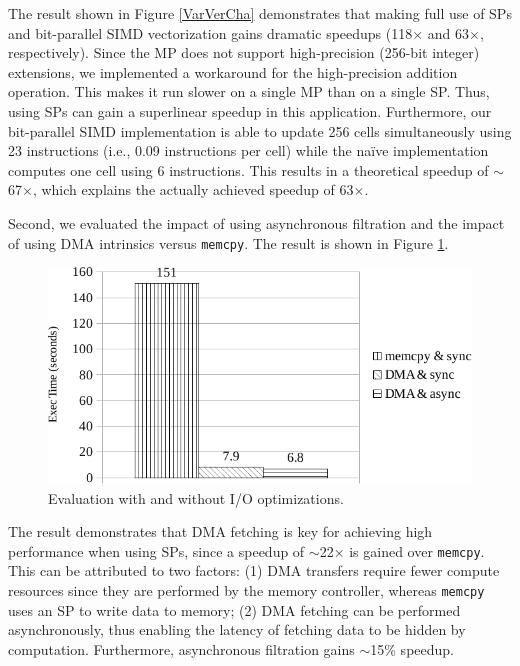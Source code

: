 \documentclass[conference]{IEEEtran}
\begin{document}
The result shown in Figure \ref{VarVerCha} demonstrates that making
full use of SPs and bit-parallel SIMD vectorization gains dramatic
speedups (118$\times$ and 63$\times$, respectively). Since the MP does
not support high-precision (256-bit integer) extensions, we
implemented a workaround for the high-precision addition
operation. This makes it run slower on a single MP than on a single
SP. Thus, using SPs can gain a superlinear speedup in this
application. Furthermore, our bit-parallel SIMD implementation is able
to update 256 cells simultaneously using 23 instructions (i.e., 0.09
instructions per cell) while the na\"ive implementation computes one
cell using 6 instructions. This results in a theoretical speedup of
$\sim$67$\times$, which explains the actually achieved speedup of
63$\times$.

Second, we evaluated the impact of using asynchronous filtration and
the impact of using DMA intrinsics versus \texttt{memcpy}. The result
is shown in Figure \ref{VarOptCha}.

\begin{figure}[!htb]
  \begin{center}
    \includegraphics[width=1\linewidth]{figures/VarOptCha}
    \caption{Evaluation with and without I/O optimizations.}
    \label{VarOptCha}
  \end{center}
\end{figure}

The result demonstrates that DMA fetching is key for achieving high
performance when using SPs, since a speedup of $\sim$22$\times$ is
gained over \texttt{memcpy}. This can be attributed to two factors:
(1) DMA transfers require fewer compute resources since they are
performed by the memory controller, whereas \texttt{memcpy} uses an SP
to write data to memory; (2) DMA fetching can be performed
asynchronously, thus enabling the latency of fetching data to be
hidden by computation. Furthermore, asynchronous filtration gains
$\sim$15\% speedup.
\end{document}
